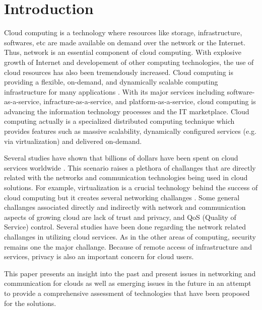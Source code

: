 
\section{Introduction}

Cloud computing is a technology where resources like storage, infrastructure, softwares, etc are made available on demand  over the network or the Internet. Thus, network is an essential component of cloud computing. With explosive growth of Internet and developement of other computing technologies, the use of cloud resources has also been tremendously increased. Cloud computing is providing a flexible, on-demand, and dynamically scalable computing infrastructure for many applications \cite{furht2010handbook}. With its major services including software-as-a-service, infracture-as-a-service, and platform-as-a-service, cloud computing is advancing the information technology processes and the IT marketplace.  Cloud computing actually is a specialized distributed computing 
technique which provides features such as massive scalability, dynamically configured services (e.g. via virtualization) and delivered on-demand. 

Several studies have shown that billions of dollars have been spent on cloud services worldwide \cite{moura2016review}. This scenario raises a plethora of challanges that are directly related with the networks and communication technologies being used in cloud solutions. For example, virtualization is a crucial technology behind the success of cloud computing but it creates several networking challanges \cite{mishra2012cloud}. Some general challanges associated directly and indirectly with network and communication aspects of growing cloud are lack of trust and privacy, and QoS (Quality of Service) control. Several studies have been done regarding the network related challanges in utilizing cloud services\cite{azodolmolky2013cloud}. As in the other areas of computing, security remains one the major challange. Because of remote access of infrastructure and services, privacy is also an important concern for cloud users\cite{takabi2010security}.

This paper presents an insight into the past and present issues in networking and communication for clouds as well as emerging issues in the future in an attempt to provide a comprehensive assessment of technologies that have been proposed for the solutions.   

